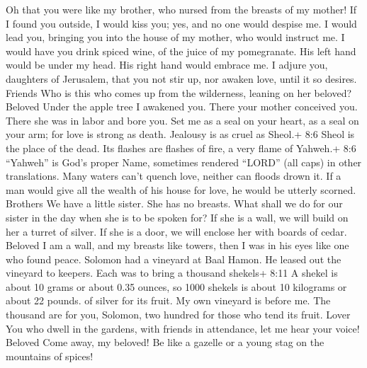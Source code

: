  Oh that you were like my brother, who nursed from the
breasts of my mother! If I found you outside, I would kiss you; yes, and
no one would despise me.  I would lead you, bringing you
into the house of my mother, who would instruct me. I would have you
drink spiced wine, of the juice of my pomegranate.  His left
hand would be under my head. His right hand would embrace me.
 I adjure you, daughters of Jerusalem, that you not stir up,
nor awaken love, until it so desires. Friends  Who is this
who comes up from the wilderness, leaning on her beloved? Beloved Under
the apple tree I awakened you. There your mother conceived you. There
she was in labor and bore you.  Set me as a seal on your
heart, as a seal on your arm; for love is strong as death. Jealousy is
as cruel as Sheol.+ 8:6 Sheol is the place of the dead. Its flashes are
flashes of fire, a very flame of Yahweh.+ 8:6 ``Yahweh'' is God's proper
Name, sometimes rendered ``LORD'' (all caps) in other translations.
 Many waters can't quench love, neither can floods drown it.
If a man would give all the wealth of his house for love, he would be
utterly scorned. Brothers  We have a little sister. She has
no breasts. What shall we do for our sister in the day when she is to be
spoken for?  If she is a wall, we will build on her a turret
of silver. If she is a door, we will enclose her with boards of cedar.
Beloved  I am a wall, and my breasts like towers, then I
was in his eyes like one who found peace.  Solomon had a
vineyard at Baal Hamon. He leased out the vineyard to keepers. Each was
to bring a thousand shekels+ 8:11 A shekel is about 10 grams or about
0.35 ounces, so 1000 shekels is about 10 kilograms or about 22 pounds.
of silver for its fruit.  My own vineyard is before me. The
thousand are for you, Solomon, two hundred for those who tend its fruit.
Lover  You who dwell in the gardens, with friends in
attendance, let me hear your voice! Beloved  Come away, my
beloved! Be like a gazelle or a young stag on the mountains of spices!
